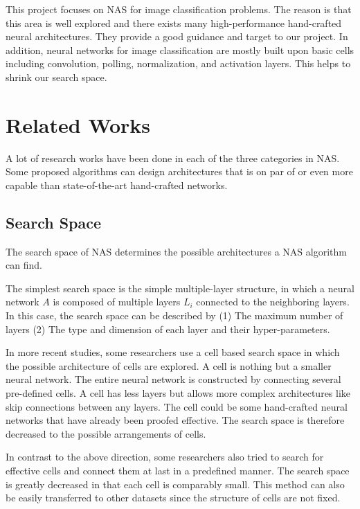 \documentclass[conference]{IEEEtran}
\begin{document}
      This project focuses on NAS for image classification problems. The reason is that this area is well explored and there exists many high-performance hand-crafted neural architectures. They provide a good guidance and target to our project. In addition, neural networks for image classification are mostly built upon basic cells including convolution, polling, normalization, and activation layers. This helps to shrink our search space.
    


    \section{Related Works}
    A lot of research works have been done in each of the three categories in NAS. Some proposed algorithms can design architectures that is on par of or even more capable than state-of-the-art hand-crafted networks.
    
    \subsection{Search Space}
    
    The search space of NAS determines the possible architectures a NAS algorithm can find.

    The simplest search space is the simple multiple-layer structure, in which a neural network $A$ is composed of multiple layers $L_i$ connected to the neighboring layers. In this case, the search space can be described by (1) The maximum number of layers (2) The type and dimension of each layer and their hyper-parameters\cite{chollet2017xception}\cite{baker2016designing}. 

    In more recent studies, some researchers use a cell based search space in which the possible architecture of cells are explored. A cell is nothing but a smaller neural network. The entire neural network is constructed by connecting several pre-defined cells. A cell has less layers but allows more complex architectures like skip connections between any layers\cite{cai2018path}\cite{real2018regularized}. The cell could be some hand-crafted neural networks that have already been proofed effective. The search space is therefore decreased to the possible arrangements of cells.

    In contrast to the above direction, some researchers also tried to search for effective cells and connect them at last in a predefined manner\cite{zoph2018learning}\cite{cai2018path}. The search space is greatly decreased in that each cell is comparably small. This method can also be easily transferred to other datasets\cite{zoph2018learning} since the structure of cells are not fixed.
\end{document}
